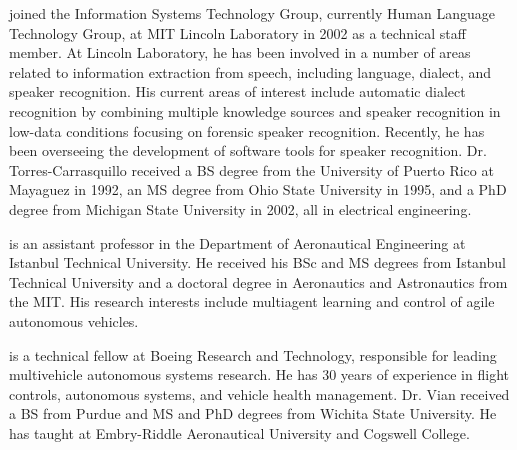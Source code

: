 \documentclass[dvipdfmx,uplatex,useotf]{dmubookJ}
\begin{document}
\begin{abouttheauthors}
 joined the Information Systems Technology Group, currently Human Language Technology Group, at MIT Lincoln Laboratory in 2002 as a technical staff member. At Lincoln Laboratory, he has been involved in a number of areas related to information extraction from speech, including language, dialect, and speaker recognition. His current areas of interest include automatic dialect recognition by combining multiple knowledge sources and speaker recognition in low-data conditions focusing on forensic speaker recognition. Recently, he has been overseeing the development of software tools for speaker recognition.  Dr. Torres-Carrasquillo received a BS degree from the University of Puerto Rico at Mayaguez in 1992, an MS degree from Ohio State University in 1995, and a PhD degree from Michigan State University in 2002, all in electrical engineering.

 is an assistant professor in the Department of Aeronautical Engineering at  Istanbul Technical University. He received his BSc and MS degrees from Istanbul Technical University and a doctoral degree in Aeronautics and Astronautics from the MIT. His research interests include multiagent learning and control of agile autonomous vehicles. 

 is a technical fellow at Boeing Research and Technology, responsible for leading multivehicle autonomous systems research. He has 30 years of experience in flight controls, autonomous systems, and vehicle health management. Dr. Vian received a BS from Purdue and MS and PhD degrees from Wichita State University. He has taught at Embry-Riddle Aeronautical University and Cogswell College.

\end{abouttheauthors}
\end{document}
